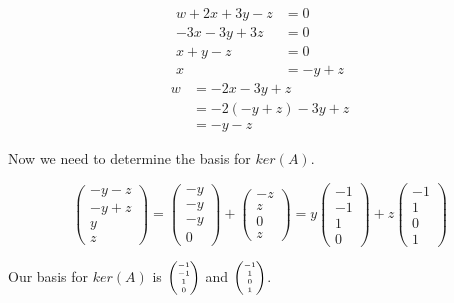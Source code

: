   \begin{align*}
    w+2x+3y-z&=0\\
    -3x-3y+3z&=0\\
    x+y-z&=0\\
    x&=-y+z
  \end{align*}
  \begin{align*}
    w&=-2x-3y+z\\
    &=-2(-y+z)-3y+z\\
    &=-y-z
  \end{align*}

  Now we need to determine the basis for $ker(A)$.

  \[
    \begin{pmatrix}
      -y-z\\-y+z\\y\\z
    \end{pmatrix}
    =\begin{pmatrix}
      -y\\-y\\-y\\0
    \end{pmatrix}
    +\begin{pmatrix}
      -z\\z\\0\\z
    \end{pmatrix}
    =y\begin{pmatrix}
      -1\\-1\\1\\0
    \end{pmatrix}
    +z\begin{pmatrix}
      -1\\1\\0\\1
    \end{pmatrix}
  \]
  
  Our basis for $ker(A)$ is $\SmallMatrix{-1\\-1\\1\\0}$ and $\SmallMatrix{-1\\1\\0\\1}$.
